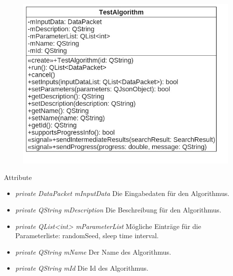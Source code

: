 \begin{figure}[H]
\centering
\includegraphics[scale=0.5]{img/Klassendiagramm/Klassen/Model/TestAlgorithm}
\label{fig:testAlgorithm}
\end{figure}

Attribute
\begin{itemize}
\item\textit{private DataPacket mInputData} Die Eingabedaten für den Algorithmus.
\item\textit{private QString mDescription} Die Beschreibung für den Algorithmus.
\item\textit{private QList<int> mParameterList} Mögliche Einträge für die Parameterliste: randomSeed, sleep time interval.
\item\textit{private QString mName} Der Name des Algorithmus.
\item\textit{private QString mId} Die Id des Algorithmus.
\end{itemize}


